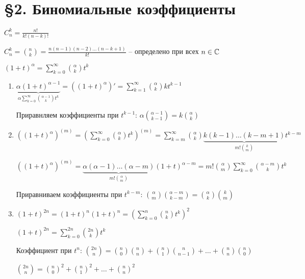 \documentclass[12pt]{article}
\begin{document}
\newpage

\section{\S 2. Биномиальные коэффициенты}

\begin{Reminder}{}
    $C_n^k = \frac{n!}{k!(n - k)!}$

    $C_n^k = {n \choose k} = \frac{n(n - 1)(n - 2) \ldots (n - k + 1)}{k!}$ -- определено при всех $n \in \mathbb C$

    $(1 + t)^\alpha = \sum\limits_{k = 0}^\infty {\alpha \choose k} t^k$
\end{Reminder}

\begin{Example}{}
    \begin{enumerate}
        \item $\underbrace{\alpha(1 + t)^{\alpha - 1}}_{\alpha\sum\limits_{k = 0}^\infty {\alpha - 1 \choose k} t^k} = ((1 + t)^\alpha)' = \sum\limits_{k = 1}^\infty {\alpha \choose k}kt^{k - 1}$
        
        Приравнляем коэффициенты при $t^{k - 1}$: $\alpha{\alpha - 1 \choose k - 1} = k {\alpha \choose k}$

        \item $((1 + t)^\alpha)^{(m)} = (\sum\limits_{k = 0}^\infty {\alpha \choose k}t^k)^{(m)} = \sum\limits_{k = m}^\infty {\alpha \choose k} \underbrace{k(k - 1) \ldots (k - m + 1)}_{m!{k \choose m}}t^{k - m}$
        
        $((1 + t)^\alpha)^{(m)} = \underbrace{\alpha(\alpha - 1)\ldots(\alpha - m)}_{m! {\alpha \choose m}}(1 + t)^{\alpha - m} = m! {\alpha \choose m} \sum\limits_{k = 0}^\infty {\alpha - m \choose k} t^k$

        Приравниваем коэффициенты при $t^{k - m}$: ${\alpha \choose m}{\alpha - m \choose k - m} = {\alpha \choose k}{k \choose m}$

        \item $(1 + t)^{2n} = (1 + t)^n(1 + t)^n = (\sum\limits_{k = 0}^n {n \choose k}t^k)^2$
        
        $(1 + t)^{2n} = \sum\limits_{k = 0}^{2n} {2n \choose k}t^k$

        Коэффициент при $t^n$: ${2n \choose n} = {n \choose 0}{n \choose n} + {n \choose 1}{n \choose n - 1} + \ldots + {n \choose n}{n \choose 0}$

        ${2n \choose n} = {n \choose 0}^2 + {n \choose 1}^2 + \ldots + {n \choose n}^2$


\end{enumerate}
\end{Example}
\end{document}
